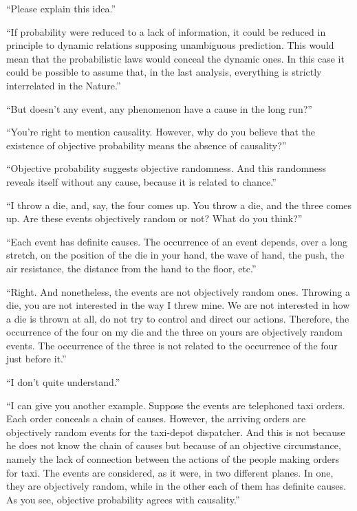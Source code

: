 \begin{dialogue}
\rdr ``Please explain this idea.''

\athr ``If probability were reduced to a lack of information, it
could be reduced in principle to dynamic relations supposing unambiguous
prediction. This would mean that the probabilistic laws would
conceal the dynamic ones. In this case it could be possible to assume
that, in the last analysis, everything is strictly interrelated in the
Nature.''

\rdr ``But doesn't any event, any phenomenon have a cause in the
long run?''

\athr ``You're right to mention causality. However, why do you
believe that the existence of objective probability means the absence
of causality?''

\rdr ``Objective probability suggests objective randomness. And
this randomness reveals itself without any cause, because it is related
to chance.''

\athr ``I throw a die, and, say, the four comes up. You throw
a die, and the three comes up. Are these events objectively random or
not? What do you think?''

\rdr ``Each event has definite causes. The occurrence of an event
depends, over a long stretch, on the position of the die in your hand,
the wave of hand, the push, the air resistance, the distance from the
hand to the floor, etc.''

\athr ``Right. And nonetheless, the events are not objectively
random ones. Throwing a die, you are not interested in the way
I threw mine. We are not interested in how a die is thrown at all, do
not try to control and direct our actions. Therefore, the occurrence of
the four on my die and the three on yours are objectively random
events. The occurrence of the three is not related to the occurrence of
the four just before it.''

\rdr ``I don't quite understand.''

\athr ``I can give you another example. Suppose the events are
telephoned taxi orders. Each order conceals a chain of causes.
However, the arriving orders are objectively random events for the
taxi-depot dispatcher. And this is not because he does not know the
chain of causes but because of an objective circumstance, namely the
lack of connection between the actions of the people making orders
for taxi. The events are considered, as it were, in two different planes.
In one, they are objectively random, while in the other each of them
has definite causes. As you see, objective probability agrees with
causality.''


\end{dialogue}
